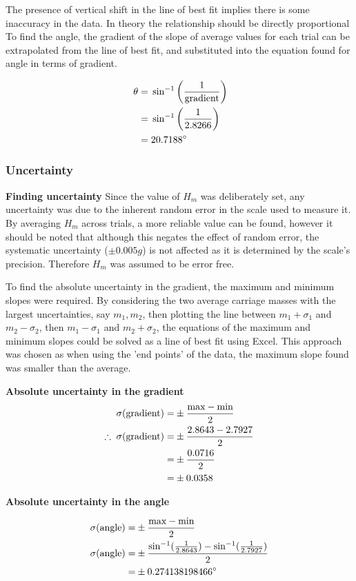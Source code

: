 \documentclass[11pt,a4paper]{article}
\begin{document}
The presence of vertical shift in the line of best fit implies there is some inaccuracy in the data. In theory the relationship should be directly proportional
To find the angle, the gradient of the slope of average values for each trial can be extrapolated from the line of best fit, and substituted into the equation found for angle in terms of gradient.

\begin{align*}
\centering
\;\theta=&\;\sin^{-1}\left(\frac{1}{\textrm{gradient}}\right)\\
 =& \;\sin^{-1}\left(\frac{1}{2.8266}\right)\\
	=&\;20.7188^\circ
\end{align*}

\subsubsection{Uncertainty}

{\large \textbf{Finding uncertainty}\newline}
Since the value of $H_m$ was deliberately set, any uncertainty was due to the inherent random error in the scale used to measure it. By averaging $H_m$ across trials, a more reliable value can be found, however it should be noted that although this negates the effect of random error, the systematic uncertainty ($\pm0.005g$) is not affected as it is determined by the scale's precision. Therefore $H_m$ was assumed to be error free.

To find the absolute uncertainty in the gradient, the maximum and minimum slopes were required. By considering the two average carriage masses with the largest uncertainties, say $m_1, m_2$, then plotting the line between $m_1+\sigma_1$ and $m_2-\sigma_2$, then  $m_1-\sigma_1$ and $m_2+\sigma_2$, the equations of the maximum and minimum slopes could be solved as a line of best fit using Excel. This approach was chosen as when using the 'end points' of the data, the maximum slope found was smaller than the average.
\begin{center}
	\textbf{Absolute uncertainty in the gradient}
	\begin{align*}
		\centering
		\sigma(\textrm{gradient})=&\pm\frac{\textrm{max}-\textrm{min}}{2}\\
		\therefore\;\sigma(\textrm{gradient})=&\pm\frac{2.8643-2.7927}{2}\\
		=&\pm\frac{0.0716}{2}\\
		=&\pm0.0358
	\end{align*}
	
	\textbf{Absolute uncertainty in the angle}
	
	\begin{align*}
		\centering
		\sigma(\textrm{angle})=&\pm\frac{\textrm{max}-\textrm{min}}{2}\\
		\sigma(\textrm{angle})=&\pm\frac{\sin^{-1}(\frac{1}{2.8643})-\sin^{-1}(\frac{1}{2.7927})}{2}\\
		=&\pm0.274138198466^\circ 
	\end{align*}
	
\end{center}
\hfill
\end{document}
